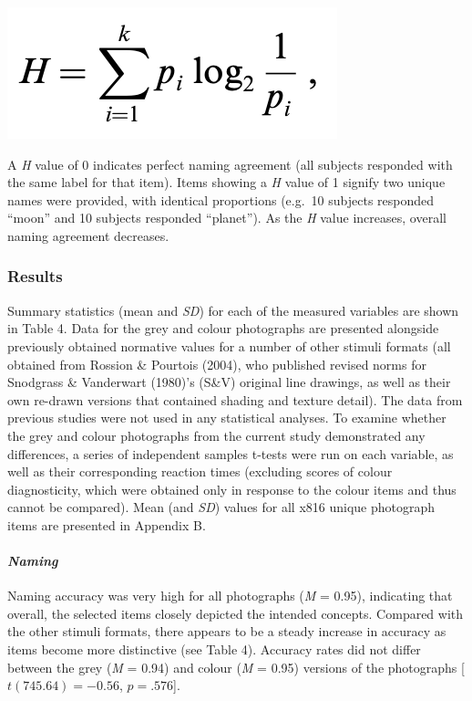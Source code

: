 \documentclass[
  11pt,
]{article}
\begin{document}
\includegraphics[width=0.5\linewidth]{./resources/images/h_calculation}

A \emph{H} value of 0 indicates perfect naming agreement (all subjects
responded with the same label for that item). Items showing a \emph{H}
value of 1 signify two unique names were provided, with identical
proportions (e.g.~10 subjects responded ``moon'' and 10 subjects
responded ``planet''). As the \emph{H} value increases, overall naming
agreement decreases.

\hypertarget{results-1}{%
\subsubsection{Results}\label{results-1}}

Summary statistics (mean and \emph{SD}) for each of the measured
variables are shown in Table 4. Data for the grey and colour photographs
are presented alongside previously obtained normative values for a
number of other stimuli formats (all obtained from Rossion \& Pourtois
(2004), who published revised norms for Snodgrass \& Vanderwart (1980)'s
(S\&V) original line drawings, as well as their own re-drawn versions
that contained shading and texture detail). The data from previous
studies were not used in any statistical analyses. To examine whether
the grey and colour photographs from the current study demonstrated any
differences, a series of independent samples t-tests were run on each
variable, as well as their corresponding reaction times (excluding
scores of colour diagnosticity, which were obtained only in response to
the colour items and thus cannot be compared). Mean (and \emph{SD})
values for all x816 unique photograph items are presented in Appendix B.

\hypertarget{naming}{%
\paragraph{\texorpdfstring{\emph{Naming}}{Naming}}\label{naming}}

Naming accuracy was very high for all photographs (\emph{M} = 0.95),
indicating that overall, the selected items closely depicted the
intended concepts. Compared with the other stimuli formats, there
appears to be a steady increase in accuracy as items become more
distinctive (see Table 4). Accuracy rates did not differ between the
grey (\emph{M} = 0.94) and colour (\emph{M} = 0.95) versions of the
photographs {[}\(t(745.64) = -0.56\), \(p = .576\){]}.
\end{document}
